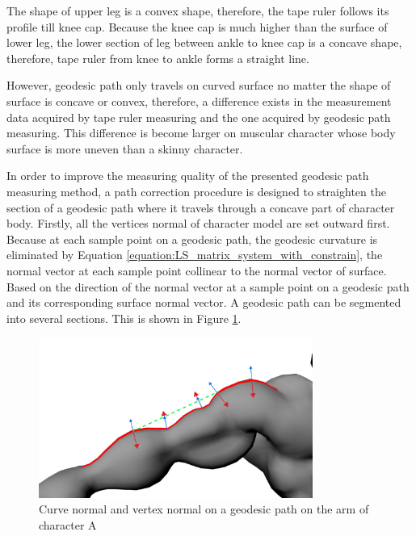 The shape of upper leg is a convex shape, therefore, the tape ruler follows its profile till knee cap. Because the knee cap is much higher than the surface of lower leg, the lower section of leg between ankle to knee cap is a concave shape, therefore, tape ruler from knee to ankle forms a straight line.

However, geodesic path only travels on curved surface no matter the shape of surface is concave or convex, therefore, a difference exists in the measurement data acquired by tape ruler measuring and the one acquired by geodesic path measuring. This difference is become larger on muscular character whose body surface is more uneven than a skinny character. 

In order to improve the measuring quality of the presented geodesic path measuring method, a path correction procedure is designed to straighten the section of a geodesic path where it travels through a concave part of character body. Firstly, all the vertices normal of character model are set outward first. Because at each sample point on a geodesic path, the geodesic curvature is eliminated by Equation \ref{equation:LS_matrix_system_with_constrain}, the normal vector at each sample point collinear to the normal vector of surface. Based on the direction of the normal vector at a sample point on a geodesic path and its corresponding surface normal vector. A geodesic path can be segmented into several sections. This is shown in Figure \ref{figure:curve_normal_vertex_normal}.

\begin{figure}[H]
	\centering
	\includegraphics[width=0.8\textwidth]{../images/geodesic_image/arm_curvature_normal}
	\caption{Curve normal and vertex normal on a geodesic path on the arm of character A}
	\label{figure:curve_normal_vertex_normal}
\end{figure}

